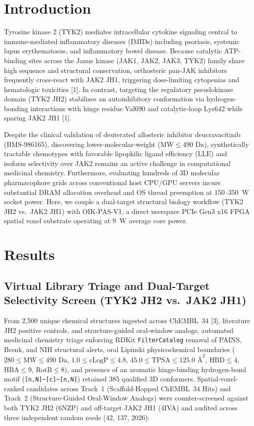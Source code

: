 \documentclass[10pt,letterpaper]{article}
\begin{document}
\section{Introduction}
Tyrosine kinase 2 (TYK2) mediates intracellular cytokine signaling central to immune-mediated inflammatory diseases (IMIDs) including psoriasis, systemic lupus erythematosus, and inflammatory bowel disease. Because catalytic ATP-binding sites across the Janus kinase (JAK1, JAK2, JAK3, TYK2) family share high sequence and structural conservation, orthosteric pan-JAK inhibitors frequently cross-react with JAK2 JH1, triggering dose-limiting cytopenias and hematologic toxicities [1]. In contrast, targeting the regulatory pseudokinase domain (TYK2 JH2) stabilizes an autoinhibitory conformation via hydrogen-bonding interactions with hinge residue Val690 and catalytic-loop Lys642 while sparing JAK2 JH1 [1].

Despite the clinical validation of deuterated allosteric inhibitor deucravacitinib (BMS-986165), discovering lower-molecular-weight ($\text{MW} \le 490\text{ Da}$), synthetically tractable chemotypes with favorable lipophilic ligand efficiency ($\text{LLE}$) and isoform selectivity over JAK2 remains an active challenge in computational medicinal chemistry. Furthermore, evaluating hundreds of 3D molecular pharmacophore grids across conventional host CPU/GPU servers incurs substantial DRAM allocation overhead and OS thread preemption at 150--350~W socket power. Here, we couple a dual-target structural biology workflow (TYK2 JH2 vs.\ JAK2 JH1) with OIK-PAS-V1, a direct userspace PCIe Gen3 x16 FPGA spatial voxel substrate operating at 9~W average core power.

\section{Results}
\subsection{Virtual Library Triage and Dual-Target Selectivity Screen (TYK2 JH2 vs.\ JAK2 JH1)}
From 2,500 unique chemical structures ingested across ChEMBL~34 [3], literature JH2 positive controls, and structure-guided oral-window analogs, automated medicinal chemistry triage enforcing RDKit \texttt{FilterCatalog} removal of PAINS, Brenk, and NIH structural alerts, oral Lipinski physicochemical boundaries ($280 \le \text{MW} \le 490\text{ Da}$, $1.0 \le \text{cLogP} \le 4.8$, $45.0 \le \text{TPSA} \le 125.0\text{ Å}^2$, $\text{HBD} \le 4$, $\text{HBA} \le 9$, $\text{RotB} \le 8$), and presence of an aromatic hinge-binding hydrogen-bond motif (\texttt{[n,N]\textasciitilde[c]\textasciitilde[n,N]}) retained 385 qualified 3D conformers. Spatial-voxel-ranked candidates across Track~1 (Scaffold-Hopped ChEMBL~34 Hits) and Track~2 (Structure-Guided Oral-Window Analogs) were counter-screened against both TYK2 JH2 (6NZP) and off-target JAK2 JH1 (4IVA) and audited across three independent random seeds (42, 137, 2026):
\end{document}
